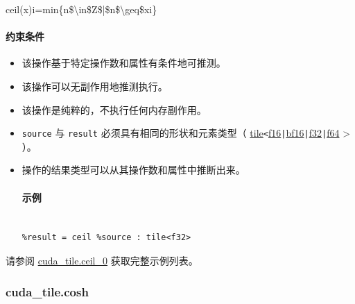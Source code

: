 \documentclass{article}
\begin{document}
ceil(x)i=min\{n\$\textbackslash{}in\$Z\$|\$n\$\textbackslash{}geq\$xi\}




\paragraph{约束条件}


\begin{itemize}
\item 该操作基于特定操作数和属性有条件地可推测。
\item 该操作可以无副作用地推测执行。
\item 该操作是纯粹的，不执行任何内存副作用。
\item \texttt{source} 与 \texttt{result} 必须具有相同的形状和元素类型（ \href{https://docs.nvidia.com/cuda/tile-ir/latest/sections/types.html#type-tile}{tile}\texttt{<}\href{https://docs.nvidia.com/cuda/tile-ir/latest/sections/types.html#subsection-element-types}{f16}\texttt{|}\href{https://docs.nvidia.com/cuda/tile-ir/latest/sections/types.html#subsection-element-types}{bf16}\texttt{|}\href{https://docs.nvidia.com/cuda/tile-ir/latest/sections/types.html#subsection-element-types}{f32}\texttt{|}\href{https://docs.nvidia.com/cuda/tile-ir/latest/sections/types.html#subsection-element-types}{f64} > ）。
\item 操作的结果类型可以从其操作数和属性中推断出来。




\paragraph{示例}


\begin{lstlisting}

%result = ceil %source : tile<f32>

\end{lstlisting}



\end{itemize}
请参阅 \href{https://docs.nvidia.com/cuda/tile-ir/latest/sections/appendix.html#example-cuda-tile-ceil-0}{cuda\_tile.ceil\_0} 获取完整示例列表。





\subsubsection{cuda\_tile.cosh}
\end{document}
